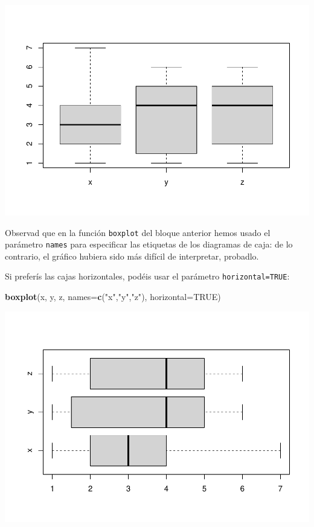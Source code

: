 \documentclass[
]{book}
\newenvironment{Shaded}{\begin{snugshade}}{\end{snugshade}}
\newcommand{\DataTypeTok}[1]{\textcolor[rgb]{0.13,0.29,0.53}{#1}}
\newcommand{\KeywordTok}[1]{\textcolor[rgb]{0.13,0.29,0.53}{\textbf{#1}}}
\newcommand{\NormalTok}[1]{#1}
\newcommand{\OtherTok}[1]{\textcolor[rgb]{0.56,0.35,0.01}{#1}}
\newcommand{\StringTok}[1]{\textcolor[rgb]{0.31,0.60,0.02}{#1}}
\theoremstyle{definition}
\theoremstyle{definition}
\theoremstyle{definition}
\theoremstyle{remark}
\begin{document}
\begin{center}\includegraphics[width=0.9\linewidth]{12chap12_Descripcion_cuantitativos_files/figure-latex/unnamed-chunk-43-1} \end{center}

Observad que en la función \texttt{boxplot} del bloque anterior hemos usado el parámetro \texttt{names} para especificar las etiquetas de los diagramas de caja: de lo contrario, el gráfico hubiera sido más difícil de interpretar, probadlo.

Si preferís las cajas horizontales, podéis usar el parámetro \texttt{horizontal=TRUE}:

\begin{Shaded}
\begin{Highlighting}[]
\KeywordTok{boxplot}\NormalTok{(x, y, z, }\DataTypeTok{names=}\KeywordTok{c}\NormalTok{(}\StringTok{"x"}\NormalTok{,}\StringTok{"y"}\NormalTok{,}\StringTok{"z"}\NormalTok{), }\DataTypeTok{horizontal=}\OtherTok{TRUE}\NormalTok{)}
\end{Highlighting}
\end{Shaded}

\begin{center}\includegraphics[width=0.9\linewidth]{12chap12_Descripcion_cuantitativos_files/figure-latex/unnamed-chunk-44-1} \end{center}
\end{document}
